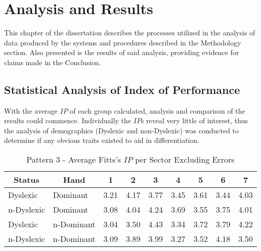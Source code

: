 \section{Analysis and Results}
	This chapter of the dissertation describes the processes utilized in the analysis of data produced by the systems and procedures described in the Methodology section. Also presented is the results of said analysis, providing evidence for claims made in the Conclusion.
	
	\subsection{Statistical Analysis of Index of Performance}
		With the average \(IP\) of each group calculated, analysis and comparison of the results could  commence. Individually the \(IP\)s reveal very little of interest, thus the analysis of demographics (Dyslexic and non-Dyslexic) was conducted to determine if any obvious traits existed to aid in differentiation.
				
		\begin{table}[h]
			\centering
			\caption{Pattern 3 - Average Fitts's \(IP\) per Sector Excluding Errors}
			\label{tab_pat_3_ip}
			\begin{tabularx}{\textwidth}{|l|l|X|X|X|X|X|X|X|}
				\hline
				\multicolumn{1}{|c|}{\textbf{Status}} & \multicolumn{1}{c|}{\textbf{Hand}} & \multicolumn{1}{c|}{\textbf{1}} & \multicolumn{1}{c|}{\textbf{2}} & \multicolumn{1}{c|}{\textbf{3}} & \multicolumn{1}{c|}{\textbf{4}} & \multicolumn{1}{c|}{\textbf{5}} & \multicolumn{1}{c|}{\textbf{6}} & \multicolumn{1}{c|}{\textbf{7}} \\ \hline
				Dyslexic                              & Dominant                           & 3.21       & 4.17       & 3.77       & 3.45       & 3.61       & 3.44       & 4.03       \\ \hline
				n-Dyslexic                          & Dominant                           & 3.08       & 4.04       & 4.24       & 3.69       & 3.55       & 3.75       & 4.01       \\ \hline
				Dyslexic                              & n-Dominant                       & 3.04       & 3.50       & 4.43       & 3.34       & 3.72       & 3.79       & 4.22       \\ \hline
				n-Dyslexic                          & n-Dominant                       & 3.09       & 3.89       & 3.99       & 3.27       & 3.52       & 4.18       & 3.50       \\ \hline
			\end{tabularx}
			\end{table}
			
